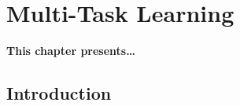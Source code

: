 
\chapter{Multi-Task Learning} %
\label{Chapter3}

\glsresetall
{} %

{\bf \small{
This chapter presents\dots
}}

\section{Introduction}








